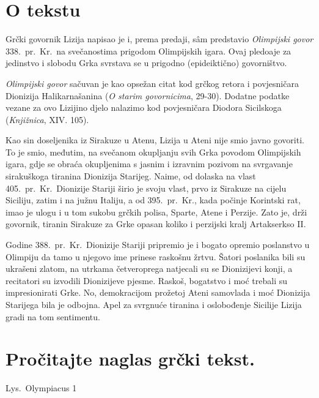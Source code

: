 

\section*{O tekstu}

Grčki govornik Lizija napisao je i, prema predaji, sâm predstavio \textit{Olimpijski govor} 338.\ pr.~Kr.\ na svečanostima prigodom Olimpijskih igara. Ovaj pledoaje za jedinstvo i slobodu Grka svrstava se u prigodno (epideiktično) govorništvo.

\textit{Olimpijski govor} sačuvan je kao opsežan citat kod grčkog retora i povjesničara Dionizija Halikarnašanina (\textit{O starim govornicima}, 29-30). Dodatne podatke vezane za ovo Lizijino djelo nalazimo kod povjesničara Diodora Sicilskoga (\textit{Knjižnica}, XIV. 105). 

Kao sin doseljenika iz Sirakuze u Atenu, Lizija u Ateni nije smio javno govoriti. To je smio, međutim, na svečanom okupljanju svih Grka povodom Olimpijskih igara, gdje se obraća okupljenima s jasnim i izravnim pozivom na svrgavanje sirakuškoga tiranina Dionizija Starijeg. Naime, od dolaska na vlast 405.\ pr.~Kr.\ Dionizije Stariji širio je svoju vlast, prvo iz Sirakuze na cijelu Siciliju, zatim i na južnu Italiju, a od 395.\ pr.~Kr., kada počinje Korintski rat, imao je ulogu i u tom sukobu grčkih polisa, Sparte, Atene i Perzije. Zato je, drži govornik, tiranin Sirakuze za Grke opasan koliko i perzijski kralj Artakserkso II.

Godine 388.\ pr.~Kr.\ Dionizije Stariji pripremio je i bogato opremio poslanstvo u Olimpiju da tamo u njegovo ime prinese raskošnu žrtvu. Šatori poslanika bili su ukrašeni zlatom, na utrkama četveroprega natjecali su se Dionizijevi konji, a recitatori su izvodili Dionizijeve pjesme. Raskoš, bogatstvo i moć trebali su impresionirati Grke. No, demokracijom prožetoj Ateni samovlada i moć Dionizija Starijega bila je odbojna. Apel za svrgnuće tiranina i oslobođenje Sicilije Lizija gradi na tom sentimentu.


\section*{Pročitajte naglas grčki tekst.}

Lys.\ Olympiacus 1

